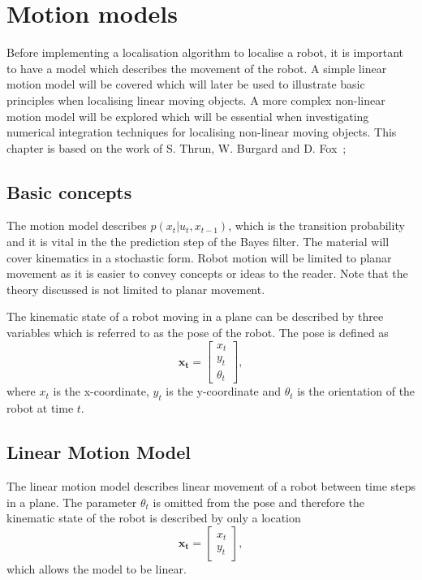 \documentclass[12pt,oneside,openany,a4paper, %
afrikaans,english,
]{memoir}
\numberwithin{equation}{chapter}
\begin{document}
\chapter{Motion models}
Before implementing a localisation algorithm to localise a robot, it is important to have a model which describes the movement of the robot. A simple linear motion model will be covered which will later be used to illustrate basic principles when localising linear moving objects. A more complex non-linear motion model will be explored which will be essential when investigating numerical integration techniques for localising non-linear moving objects. This chapter is based on the work of S. Thrun, W. Burgard and D. Fox~\citep{thrun};
\section{Basic concepts}
The motion model describes $p(x_t|u_t,x_{t-1})$, which is the transition probability and it is vital in the the prediction step of the Bayes filter. The material will cover kinematics in a stochastic form. Robot motion will be limited to planar movement as it is easier to convey concepts or ideas to the reader. Note that the theory discussed is not limited to planar movement.

The kinematic state of a robot moving in a plane can be described by three variables which is referred to as the pose of the robot.
The pose is defined as
\begin{equation}
\bm{x_t} =
\begin{bmatrix}
x_t\\
y_t\\
\theta_t
\end{bmatrix},
\end{equation}
where $x_t$ is the x-coordinate, $y_t$ is the y-coordinate and $\theta_t$ is the orientation of the robot at time $t$. 
\section{Linear Motion Model}
The linear motion model describes linear movement of a robot between time steps in a plane. The parameter $\theta_t$ is omitted from the pose  and therefore the kinematic state of the robot is described by only a location
\begin{equation}
\bm{x_t} =
\begin{bmatrix}
x_t\\
y_t
\end{bmatrix},
\end{equation}
which allows the model to be linear.
\end{document}
